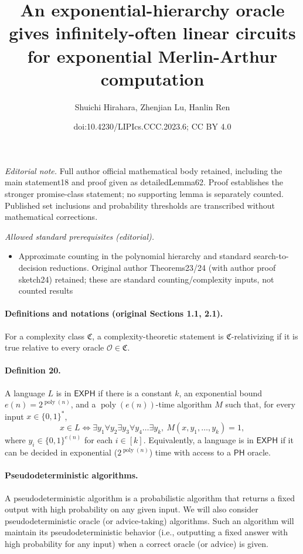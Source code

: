 \documentclass[10pt,a4paper]{article}
\title{An exponential-hierarchy oracle gives infinitely-often linear circuits for exponential Merlin-Arthur computation}
\author{Shuichi Hirahara, Zhenjian Lu, Hanlin Ren}
\date{doi:10.4230/LIPIcs.CCC.2023.6; CC BY 4.0}
\begin{document}
\maketitle
\noindent\textit{Editorial note.} Full author official mathematical body retained, including the main statement18 and proof given as detailedLemma62. Proof establishes the stronger promise-class statement; no supporting lemma is separately counted. Published set inclusions and probability thresholds are transcribed without mathematical corrections.\par\medskip
\noindent\textit{Allowed standard prerequisites (editorial).}\begin{itemize}
\item Approximate counting in the polynomial hierarchy and standard search-to-decision reductions. Original author Theorems23/24 (with author proof sketch24) retained; these are standard counting/complexity inputs, not counted results
\end{itemize}\medskip
\paragraph{Definitions and notations (original Sections 1.1, 2.1).}
For a complexity class $\mathfrak C$, a complexity-theoretic statement is $\mathfrak C$-relativizing if it is true relative to every oracle $\mathcal O\in\mathfrak C$.
\paragraph{Definition 20.} A language $L$ is in $\mathsf{EXPH}$ if there is a constant $k$, an exponential bound $e(n)=2^{\operatorname{poly}(n)}$, and a $\operatorname{poly}(e(n))$-time algorithm $M$ such that, for every input $x\in\{0,1\}^*$,
\[x\in L\Longleftrightarrow\exists y_1\forall y_2\exists y_3\forall y_4\ldots\exists y_k,\ M(x,y_1,\ldots,y_k)=1,\]
where $y_i\in\{0,1\}^{e(n)}$ for each $i\in[k]$. Equivalently, a language is in $\mathsf{EXPH}$ if it can be decided in exponential ($2^{\operatorname{poly}(n)}$) time with access to a $\mathsf{PH}$ oracle.
\paragraph{Pseudodeterministic algorithms.} A pseudodeterministic algorithm is a probabilistic algorithm that returns a fixed output with high probability on any given input. We will also consider pseudodeterministic oracle (or advice-taking) algorithms. Such an algorithm will maintain its pseudodeterministic behavior (i.e., outputting a fixed answer with high probability for any input) when a correct oracle (or advice) is given.
\end{document}
